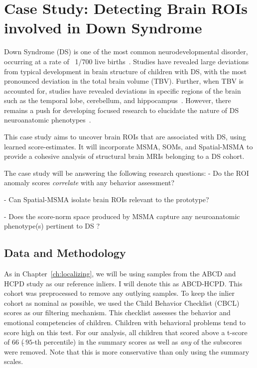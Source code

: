 \section{Case Study: Detecting Brain ROIs involved in Down Syndrome}

Down Syndrome (DS) is one of the most common neurodevelopmental disorder, occurring at a rate of ~1/700 live births~\cite{parker2010updated}. Studies have revealed large deviations from typical development in brain structure of children with DS, with the most pronounced deviation in the total brain volume (TBV). Further, when TBV is accounted for, studies have revealed deviations in specific regions of the brain such as the temporal lobe, cerebellum, and hippocampus~\cite{hamnerPediatricBrainDevelopment2018}. However, there remains a push for developing focused research to elucidate the nature of DS neuroanatomic phenotypes~\cite{hamnerPediatricBrainDevelopment2018}.

This case study aims to uncover brain ROIs that are associated with DS, using learned score-estimates. It will incorporate MSMA, SOMs, and Spatial-MSMA to provide a cohesive analysis of structural brain MRIs belonging to a DS cohort.

The case study will be answering the following research questions:
    - Do the ROI anomaly scores \textit{correlate} with any behavior assessment?
 
    - Can Spatial-MSMA isolate brain ROIs relevant to the prototype?
 
    - Does the score-norm space produced by MSMA capture any neuroanatomic phenotype(s) pertinent to DS ?
 

 



\subsection*{Data and Methodology}
 
As in Chapter~\ref{ch:localizing}, we will be using samples from the ABCD and HCPD study as our reference inliers. I will denote this as ABCD-HCPD. This cohort was preprocessed to remove any outlying samples. To keep the inlier cohort as nominal as possible, we used the Child Behavior Checklist (CBCL)~ scores as our filtering mechanism. This checklist assesses the behavior and emotional competencies of children. Children with behavioral problems tend to score high on this test. For our analysis, all children that scored above a t-score of 66 ($\tilde~95$-th percentile) in the summary scores as well as \textit{any} of the subscores were removed. Note that this is more conservative than only using the summary scales.

